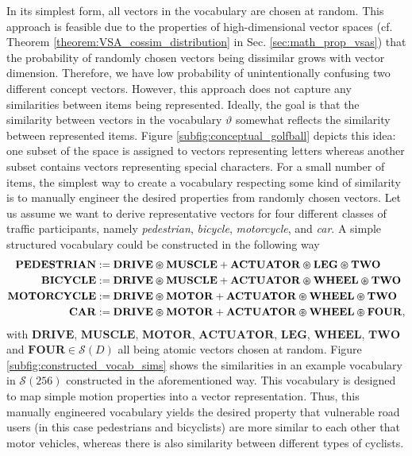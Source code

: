 In its simplest form, all vectors in the vocabulary are chosen at random.
This approach is feasible due to the properties of high-dimensional vector spaces (cf. Theorem \ref{theorem:VSA_cossim_distribution} in Sec. \ref{sec:math_prop_vsas}) that the probability of randomly chosen vectors being dissimilar grows with vector dimension.
Therefore,  we have low probability of unintentionally confusing two different concept vectors.
However, this approach does not capture any similarities between items being represented.
Ideally, the goal is that the similarity between vectors in the vocabulary $\vartheta$ somewhat reflects the similarity between represented items.
Figure \ref{subfig:conceptual_golfball} depicts this idea: one subset of the space is assigned to vectors representing letters whereas another subset contains vectors representing special characters.
For a small number of items, the simplest way to create a vocabulary respecting some kind of similarity is to manually engineer the desired properties from randomly chosen vectors.
Let us assume we want to derive representative vectors for four different classes of traffic participants, namely \emph{pedestrian}, \emph{bicycle}, \emph{motorcycle},  and \emph{car}.
A simple structured vocabulary could be constructed in the following way
\begin{align*}
\mathbf{PEDESTRIAN} &:= \mathbf{DRIVE} \varoast \mathbf{MUSCLE} + \mathbf{ACTUATOR} \varoast \mathbf{LEG} \varoast \mathbf{TWO} \\
\mathbf{BICYCLE} &:= \mathbf{DRIVE} \varoast \mathbf{MUSCLE} + \mathbf{ACTUATOR} \varoast \mathbf{WHEEL} \varoast \mathbf{TWO}\\
\mathbf{MOTORCYCLE} &:= \mathbf{DRIVE} \varoast \mathbf{MOTOR} + \mathbf{ACTUATOR} \varoast \mathbf{WHEEL} \varoast \mathbf{TWO}\\
\mathbf{CAR} &:= \mathbf{DRIVE} \varoast \mathbf{MOTOR} + \mathbf{ACTUATOR} \varoast \mathbf{WHEEL} \varoast \mathbf{FOUR},
\end{align*}
with $\mathbf{DRIVE}$, $\mathbf{MUSCLE}$, $\mathbf{MOTOR}$, $\mathbf{ACTUATOR}$, $\mathbf{LEG}$, $\mathbf{WHEEL}$, $\mathbf{TWO}$ and $\mathbf{FOUR} \in \mathcal{S}(D)$ all being atomic vectors chosen at random.
Figure \ref{subfig:constructed_vocab_sims} shows the similarities in an example vocabulary in $\mathcal{S}(256)$ constructed in the aforementioned way.
This vocabulary is designed to map simple motion properties into a vector representation.
Thus, this manually engineered vocabulary yields the desired property that vulnerable road users (in this case pedestrians and bicyclists) are more similar to each other that motor vehicles, whereas there is also similarity between different types of cyclists.
